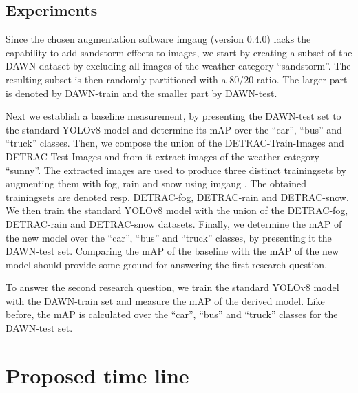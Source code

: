 \documentclass[]{article}
\begin{document}
\subsection{Experiments}

	Since the chosen augmentation software imgaug \cite{imgaug} (version 0.4.0) lacks the capability to add sandstorm effects to images, we start by creating a subset of the DAWN dataset by excluding all images of the weather category ``sandstorm''. The resulting subset is then randomly partitioned with a 80/20 ratio. The larger part is denoted by DAWN-train and the smaller part by DAWN-test. 
	
	Next we establish a baseline measurement, by presenting the DAWN-test set to the standard YOLO{\small v8} model and determine its mAP over the ``car'', ``bus'' and ``truck'' classes. Then, we compose the union of the DETRAC-Train-Images and DETRAC-Test-Images and from it extract images of the weather category ``sunny''. The extracted images are used to produce three distinct trainingsets by augmenting them with fog, rain and snow using imgaug \cite{imgaug}. The obtained trainingsets are denoted resp. DETRAC-fog, DETRAC-rain and DETRAC-snow. We then train the standard YOLO{\small v8} model with the union of the DETRAC-fog, DETRAC-rain and DETRAC-snow datasets. Finally, we determine the mAP of the new model over the  ``car'', ``bus'' and ``truck'' classes, by presenting it the DAWN-test set. Comparing the mAP of the baseline with the mAP of the new model should provide some ground for answering the first research question.
	
	To answer the second research question, we train the standard YOLO{\small v8} model with the DAWN-train set and measure the mAP of the derived model. Like before, the mAP is calculated over the ``car'', ``bus'' and ``truck'' classes for the DAWN-test set.

\section{Proposed time line}



\printbibliography
\end{document}
